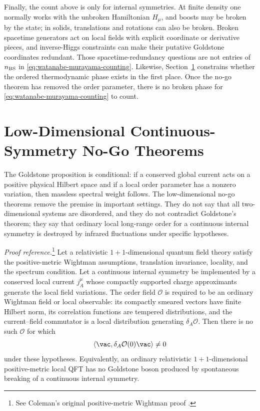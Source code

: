 Finally, the count above is only for internal symmetries.  At finite density
one normally works with the unbroken Hamiltonian \(H_\mu\), and boosts may be
broken by the state; in solids, translations and rotations can also be broken.
Broken spacetime generators act on local fields with explicit coordinate or
derivative pieces, and inverse-Higgs constraints can make their putative
Goldstone coordinates redundant.  Those spacetime-redundancy questions are
not entries of \(n_{\rm BS}\) in
\eqref{eq:watanabe-murayama-counting}.  Likewise,
Section~\ref{sec:low-dimensional-continuous-ssb-no-go} constrains whether the
ordered thermodynamic phase exists in the first place.  Once the no-go theorem
has removed the order parameter, there is no broken phase for
\eqref{eq:watanabe-murayama-counting} to count.

\section{Low-Dimensional Continuous-Symmetry No-Go Theorems}
\label{sec:low-dimensional-continuous-ssb-no-go}

The Goldstone proposition is conditional: if a conserved global current acts
on a positive physical Hilbert space and if a local order parameter has a
nonzero variation, then massless spectral weight follows.  The low-dimensional
no-go theorems remove the premise in important settings.  They do not say that
all two-dimensional systems are disordered, and they do not contradict
Goldstone's theorem; they say that ordinary local long-range order for a
continuous internal symmetry is destroyed by infrared fluctuations under
specific hypotheses.

\begin{quotedtheorem}
\label{qthm:coleman-no-goldstone-two-dimensions}
\emph{Proof reference.}\footnote{See
Coleman's original positive-metric Wightman proof
\cite{Coleman1973NoGoldstone}.}
Let a relativistic \(1+1\)-dimensional quantum field theory satisfy the
positive-metric Wightman assumptions, translation invariance, locality, and the
spectrum condition.  Let a continuous internal symmetry be implemented by a
conserved local current \(j_A^\mu\) whose compactly supported charge
approximants generate the local field variations.  The order field
\(\mathcal O\) is required to be an ordinary Wightman field or local observable:
its compactly smeared vectors have finite Hilbert norm, its correlation
functions are tempered distributions, and the current--field commutator is a
local distribution generating \(\delta_A\mathcal O\).  Then there is no such
\(\mathcal O\) for which
\[
  \langle\vac,\delta_A\mathcal O(0)\vac\rangle\ne0
\]
under these hypotheses.  Equivalently, an ordinary relativistic
\(1+1\)-dimensional positive-metric local QFT has no Goldstone boson produced
by spontaneous breaking of a continuous internal symmetry.
\end{quotedtheorem}

